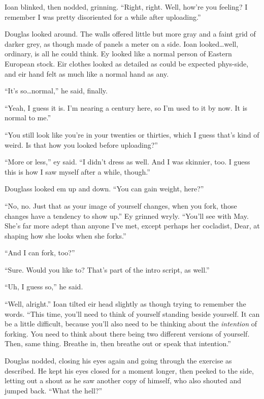 Ioan blinked, then nodded, grinning. ``Right, right. Well, how're you feeling? I remember I was pretty disoriented for a while after uploading.''

Douglas looked around. The walls offered little but more gray and a faint grid of darker grey, as though made of panels a meter on a side. Ioan looked\ldots well, ordinary, is all he could think. Ey looked like a normal person of Eastern European stock. Eir clothes looked as detailed as could be expected phys-side, and eir hand felt as much like a normal hand as any.

``It's so\ldots normal,'' he said, finally.

``Yeah, I guess it is. I'm nearing a century here, so I'm used to it by now. It is normal to me.''

``You still look like you're in your twenties or thirties, which I guess that's kind of weird. Is that how you looked before uploading?''

``More or less,'' ey said. ``I didn't dress as well. And I was skinnier, too. I guess this is how I saw myself after a while, though.''

Douglass looked em up and down. ``You can gain weight, here?''

``No, no. Just that as your image of yourself changes, when you fork, those changes have a tendency to show up.'' Ey grinned wryly. ``You'll see with May. She's far more adept than anyone I've met, except perhaps her cocladist, Dear, at shaping how she looks when she forks.''

``And I can fork, too?''

``Sure. Would you like to? That's part of the intro script, as well.''

``Uh, I guess so,'' he said.

``Well, alright.'' Ioan tilted eir head slightly as though trying to remember the words. ``This time, you'll need to think of yourself standing beside yourself. It can be a little difficult, because you'll also need to be thinking about the \emph{intention} of forking. You need to think about there being two different versions of yourself. Then, same thing. Breathe in, then breathe out or speak that intention.''

Douglas nodded, closing his eyes again and going through the exercise as described. He kept his eyes closed for a moment longer, then peeked to the side, letting out a shout as he saw another copy of himself, who also shouted and jumped back. ``What the hell?''

